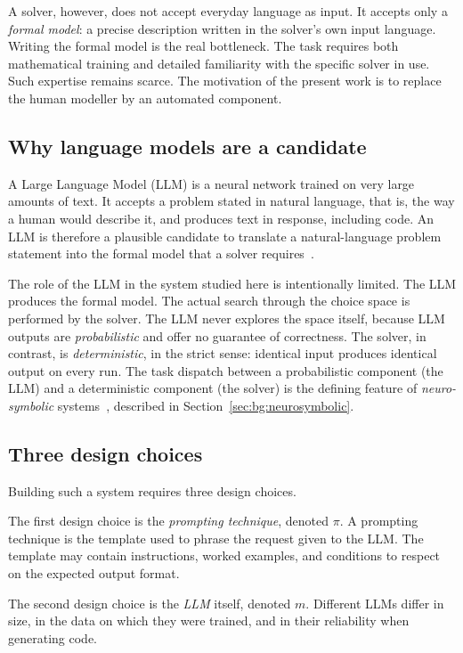 \documentclass[11pt,a4paper]{article}
\begin{document}
A solver, however, does not accept everyday language as input. It accepts only a \emph{formal model}: a precise description written in the solver's own input language. Writing the formal model is the real bottleneck. The task requires both mathematical training and detailed familiarity with the specific solver in use. Such expertise remains scarce. The motivation of the present work is to replace the human modeller by an automated component.

\subsection{Why language models are a candidate}\label{sec:intro:llm}
A Large Language Model (LLM) is a neural network trained on very large amounts of text. It accepts a problem stated in natural language, that is, the way a human would describe it, and produces text in response, including code. An LLM is therefore a plausible candidate to translate a natural-language problem statement into the formal model that a solver requires~\cite{R3}.

The role of the LLM in the system studied here is intentionally limited. The LLM produces the formal model. The actual search through the choice space is performed by the solver. The LLM never explores the space itself, because LLM outputs are \emph{probabilistic} and offer no guarantee of correctness. The solver, in contrast, is \emph{deterministic}, in the strict sense: identical input produces identical output on every run. The task dispatch between a probabilistic component (the LLM) and a deterministic component (the solver) is the defining feature of \emph{neuro-symbolic} systems~\cite{R7}, described in Section~\ref{sec:bg:neurosymbolic}.

\subsection{Three design choices}\label{sec:intro:axes}
Building such a system requires three design choices.

The first design choice is the \emph{prompting technique}, denoted $\pi$. A prompting technique is the template used to phrase the request given to the LLM. The template may contain instructions, worked examples, and conditions to respect on the expected output format.

The second design choice is the \emph{LLM} itself, denoted $m$. Different LLMs differ in size, in the data on which they were trained, and in their reliability when generating code.
\end{document}
